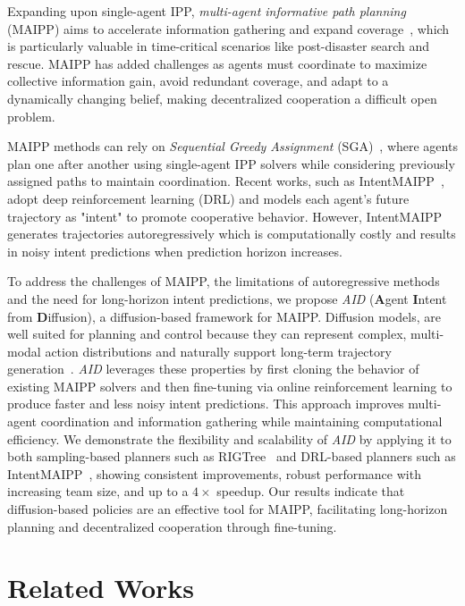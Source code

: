 \documentclass[runningheads]{llncs}
\begin{document}
Expanding upon single-agent IPP, \textit{multi-agent informative path planning} (MAIPP) aims to accelerate information gathering and expand coverage~\cite{MA_ipp,popo_ma}, which is particularly valuable in time-critical scenarios like post-disaster search and rescue. MAIPP has added challenges as agents must coordinate to maximize collective information gain, avoid redundant coverage, and adapt to a dynamically changing belief, making decentralized cooperation a difficult open problem.

MAIPP methods can rely on \textit{Sequential Greedy Assignment} (SGA)~\cite{corah2017efficient}, where agents plan one after another using single-agent IPP solvers while considering previously assigned paths to maintain coordination. Recent works, such as IntentMAIPP~\cite{yang2023intentmaipp}, adopt deep reinforcement learning (DRL) and models each agent’s future trajectory as "intent" to promote cooperative behavior. However, IntentMAIPP generates trajectories autoregressively which is computationally costly and results in noisy intent predictions when prediction horizon increases.

To address the challenges of MAIPP, the limitations of autoregressive methods and the need for long-horizon intent predictions, we propose \textit{AID} (\textbf{A}gent \textbf{I}ntent from \textbf{D}iffusion), a diffusion-based framework for MAIPP. Diffusion models, are well suited for planning and control because they can represent complex, multi-modal action distributions and naturally support long-term trajectory generation~\cite{cao2025dare,chi2024diffusionpolicy,janner2022diffuser}.
\textit{AID} leverages these properties by first cloning the behavior of existing MAIPP solvers and then fine-tuning via online reinforcement learning to produce faster and less noisy intent predictions. This approach improves multi-agent coordination and information gathering while maintaining computational efficiency. We demonstrate the flexibility and scalability of \textit{AID} by applying it to both sampling-based planners such as RIGTree~\cite{Hollinger_2014_ippsample} and DRL-based planners such as IntentMAIPP~\cite{yang2023intentmaipp}, showing consistent improvements, robust performance with increasing team size, and up to a $4\times$ speedup. Our results indicate that diffusion-based policies are an effective tool for MAIPP, facilitating long-horizon planning and decentralized cooperation through fine-tuning.

\section{Related Works}
\end{document}
